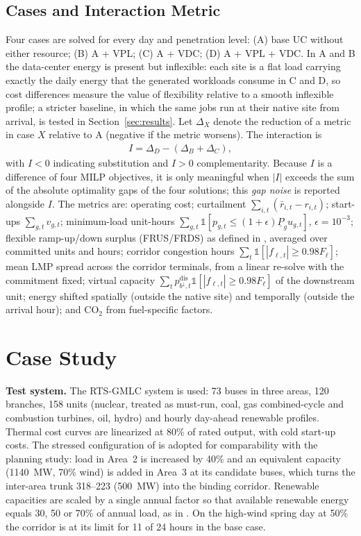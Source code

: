 \documentclass[conference]{IEEEtran}
\begin{document}
\subsection{Cases and Interaction Metric}
\label{sec:metrics}
Four cases are solved for every day and penetration level: (A) base UC without either resource; (B) A + VPL; (C) A + VDC; (D) A + VPL + VDC. In A and B the data-center energy is present but inflexible: each site is a flat load carrying exactly the daily energy that the generated workloads consume in C and D, so cost differences measure the value of flexibility relative to a smooth inflexible profile; a stricter baseline, in which the same jobs run at their native site from arrival, is tested in Section~\ref{sec:results}. Let $\Delta_X$ denote the reduction of a metric in case $X$ relative to A (negative if the metric worsens). The interaction is
\begin{align}
I = \Delta_D - (\Delta_B + \Delta_C),
\label{eq:interaction}
\end{align}
with $I<0$ indicating substitution and $I>0$ complementarity. Because $I$ is a difference of four MILP objectives, it is only meaningful when $|I|$ exceeds the sum of the absolute optimality gaps of the four solutions; this \emph{gap noise} is reported alongside $I$. The metrics are: operating cost; curtailment $\sum_{i,t}(\bar r_{i,t}-r_{i,t})$; start-ups $\sum_{g,t} v_{g,t}$; minimum-load unit-hours $\sum_{g,t} \mathbb{1}[p_{g,t} \le (1+\epsilon)\underline{P}_g u_{g,t}]$, $\epsilon=10^{-3}$; flexible ramp-up/down surplus (FRUS/FRDS) as defined in \cite{ferreira2026}, averaged over committed units and hours; corridor congestion hours $\sum_t \mathbb{1}[|f_{\ell,t}| \ge 0.98 F_\ell]$; mean LMP spread across the corridor terminals, from a linear re-solve with the commitment fixed; virtual capacity $\sum_t p^{\mathrm{dis}}_{b^{\downarrow},t}\mathbb{1}[|f_{\ell,t}| \ge 0.98F_\ell]$ of the downstream unit; energy shifted spatially (outside the native site) and temporally (outside the arrival hour); and CO$_2$ from fuel-specific factors.

\section{Case Study}
\label{sec:case}

\textbf{Test system.} The RTS-GMLC system \cite{barrows2020rts} is used: 73 buses in three areas, 120 branches, 158 units (nuclear, treated as must-run, coal, gas combined-cycle and combustion turbines, oil, hydro) and hourly day-ahead renewable profiles. Thermal cost curves are linearized at 80\% of rated output, with cold start-up costs. The stressed configuration of \cite{ferreira2026} is adopted for comparability with the planning study: load in Area~2 is increased by 40\% and an equivalent capacity (1140~MW, 70\% wind) is added in Area~3 at its candidate buses, which turns the inter-area trunk 318--223 (500~MW) into the binding corridor. Renewable capacities are scaled by a single annual factor so that available renewable energy equals 30, 50 or 70\% of annual load, as in \cite{ferreira2026}. On the high-wind spring day at 50\% the corridor is at its limit for 11 of 24 hours in the base case.
\end{document}
